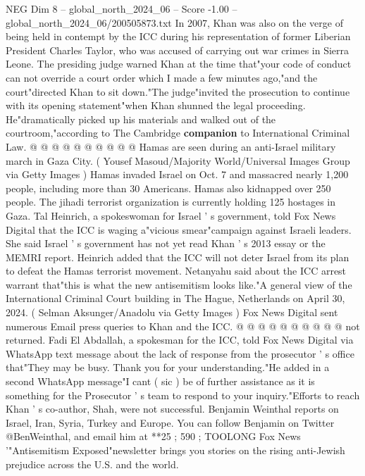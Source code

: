 \begin{textsample}{NEG Dim 8 – global\_north\_2024\_06 – Score -1.00 – global\_north\_2024\_06/200505873.txt}
In 2007, Khan was also on the verge of being held in contempt by the ICC during his representation of former Liberian President Charles Taylor, who was accused of carrying out war crimes in Sierra Leone.
The presiding judge warned Khan at the time that"your code of conduct can not override a court order which I made a few minutes ago,"and the court"directed Khan to sit down."The judge"invited the prosecution to continue with its opening statement"when Khan shunned the legal proceeding.
He"dramatically picked up his materials and walked out of the courtroom,"according to The Cambridge \textbf{companion} to International Criminal Law. @ @ @ @ @ @ @ @ @ @ Hamas are seen during an anti-Israel military march in Gaza City. ( Yousef Masoud/Majority World/Universal Images Group via Getty Images ) Hamas invaded Israel on Oct. 7 and massacred nearly 1,200 people, including more than 30 Americans.
Hamas also kidnapped over 250 people.
The jihadi terrorist organization is currently holding 125 hostages in Gaza.
Tal Heinrich, a spokeswoman for Israel ' s government, told Fox News Digital that the ICC is waging a"vicious smear"campaign against Israeli leaders.
She said Israel ' s government has not yet read Khan ' s 2013 essay or the MEMRI report.
Heinrich added that the ICC will not deter Israel from its plan to defeat the Hamas terrorist movement.
Netanyahu said about the ICC arrest warrant that"this is what the new antisemitism looks like."A general view of the International Criminal Court building in The Hague, Netherlands on April 30, 2024. ( Selman Aksunger/Anadolu via Getty Images ) Fox News Digital sent numerous Email press queries to Khan and the ICC. @ @ @ @ @ @ @ @ @ @ not returned.
Fadi El Abdallah, a spokesman for the ICC, told Fox News Digital via WhatsApp text message about the lack of response from the prosecutor ' s office that"They may be busy.
Thank you for your understanding."He added in a second WhatsApp message"I cant ( sic ) be of further assistance as it is something for the Prosecutor ' s team to respond to your inquiry."Efforts to reach Khan ' s co-author, Shah, were not successful.
Benjamin Weinthal reports on Israel, Iran, Syria, Turkey and Europe.
You can follow Benjamin on Twitter @BenWeinthal, and email him at **25 ; 590 ; TOOLONG Fox News '"Antisemitism Exposed"newsletter brings you stories on the rising anti-Jewish prejudice across the U.S. and the world.

\end{textsample}
